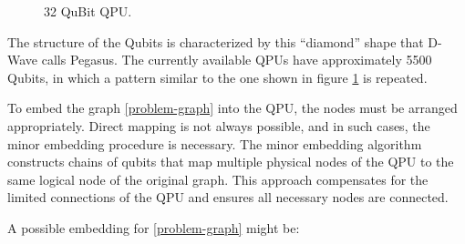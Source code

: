 \begin{figure}[H]
\begin{center}
      \caption{32 QuBit QPU.}
      \label{QPU}
  \end{center}
\end{figure}

The structure of the Qubits is characterized by this ``diamond'' shape that D-Wave calls Pegasus. The currently available QPUs have approximately 5500 Qubits, in which a pattern similar to the one shown in figure \ref{QPU} is repeated.

To embed the graph \ref{problem-graph} into the QPU, the nodes must be arranged appropriately. Direct mapping is not always possible, and in such cases, the minor embedding procedure\cite{ME} is necessary. The minor embedding algorithm\cite{MEdwave} constructs chains of qubits that map multiple physical nodes of the QPU to the same logical node of the original graph. This approach compensates for the limited connections of the QPU and ensures all necessary nodes are connected.

A possible embedding for \ref{problem-graph} might be:

